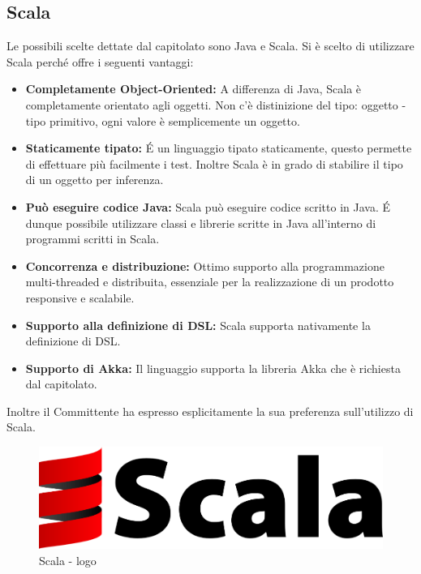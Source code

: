 \documentclass[a4paper]{article}
\begin{document}
	\subsection{Scala}
		Le possibili scelte dettate dal capitolato sono Java e Scala. Si è scelto di utilizzare Scala perché offre i seguenti vantaggi:
		\begin{itemize}
            \item \textbf{Completamente Object-Oriented:} A differenza di Java, Scala è completamente orientato agli oggetti. Non c'è distinizione del tipo: oggetto - tipo primitivo, ogni valore è semplicemente un oggetto.
			\item \textbf{Staticamente tipato:} \'E un linguaggio tipato staticamente, questo permette di effettuare più facilmente i test. Inoltre Scala è in grado di stabilire il tipo di un oggetto per inferenza.
            \item \textbf{Può eseguire codice Java:} Scala può eseguire codice scritto in Java. \'E dunque possibile utilizzare classi e librerie scritte in Java all'interno di programmi scritti in Scala. 
            \item \textbf{Concorrenza e distribuzione:} Ottimo supporto alla programmazione multi-threaded e distribuita, essenziale per la realizzazione di un prodotto responsive e scalabile.
			\item \textbf{Supporto alla definizione di DSL:} Scala supporta nativamente la definizione di DSL.
            \item \textbf{Supporto di Akka:} Il linguaggio supporta la libreria Akka che è richiesta dal capitolato.
		\end{itemize}
		Inoltre il Committente ha espresso esplicitamente la sua preferenza sull'utilizzo di Scala.
		\begin{figure} [H]
			\centering
			\includegraphics[scale=0.15]{immagini/ST/scala.png}
			\caption{Scala - logo}
		\end{figure}	
\end{document}
